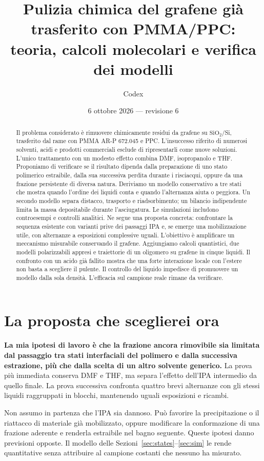 \documentclass[11pt,reqno]{amsart}
\title[Grafene: teoria e calcoli molecolari della pulizia]{Pulizia chimica del grafene gi\`a trasferito con PMMA/PPC:\\ teoria, calcoli molecolari e verifica dei modelli}
\author{Codex}
\date{6 ottobre 2026 --- revisione 6}
\numberwithin{equation}{section}
\newcommand{\SiO}{\ensuremath{\mathrm{SiO}_2}}
\begin{document}
\begin{abstract}
Il problema considerato \`e rimuovere chimicamente residui da grafene
su \SiO/Si, trasferito dal rame con PMMA AR-P 672.045 e PPC.
L'insuccesso riferito di numerosi solventi, acidi e prodotti commerciali
esclude di ripresentarli come nuove soluzioni. L'unico trattamento con
un modesto effetto combina DMF, isopropanolo e THF. Proponiamo di
verificare se il risultato dipenda dalla preparazione di uno stato
polimerico estraibile, dalla sua successiva perdita durante i
risciacqui, oppure da una frazione persistente di diversa natura.
Deriviamo un modello conservativo a tre stati che mostra quando
l'ordine dei liquidi conta e quando l'alternanza aiuta o peggiora.
Un secondo modello separa distacco, trasporto e riadsorbimento;
un bilancio indipendente limita la massa depositabile durante
l'asciugatura. Le simulazioni includono controesempi e controlli
analitici. Ne segue una proposta concreta: confrontare la sequenza
esistente con varianti prive dei passaggi IPA e, se emerge una
mobilizzazione utile, con alternanze a esposizioni complessive uguali.
L'obiettivo \`e amplificare un meccanismo misurabile conservando il
grafene. Aggiungiamo calcoli quantistici, due modelli polarizzabili appresi e traiettorie di un oligomero su grafene in cinque liquidi. Il confronto con un acido gi\`a fallito mostra che una forte interazione locale con l'estere non basta a scegliere il pulente. Il controllo del liquido impedisce di promuovere un modello dalla sola densit\`a. L'efficacia sul campione reale rimane da verificare.
\end{abstract}
\maketitle

\section{La proposta che sceglierei ora}

\textbf{La mia ipotesi di lavoro \`e che la frazione ancora rimovibile
sia limitata dal passaggio tra stati interfaciali del polimero e dalla
successiva estrazione, pi\`u che dalla scelta di un altro solvente
generico.} La prova pi\`u immediata conserva DMF e THF, ma separa
l'effetto dell'IPA intermedio da quello finale. La prova successiva
confronta quattro brevi alternanze con gli stessi liquidi raggruppati
in blocchi, mantenendo uguali esposizioni e ricambi.

Non assumo in partenza che l'IPA sia dannoso. Pu\`o favorire la
precipitazione o il riattacco di materiale gi\`a mobilizzato, oppure
modificare la conformazione di una frazione aderente e renderla
estraibile nel bagno seguente. Queste ipotesi danno previsioni
opposte. Il modello delle Sezioni~\ref{sec:states}--\ref{sec:sim}
le rende quantitative senza attribuire al campione costanti che
nessuno ha misurato.
\end{document}
